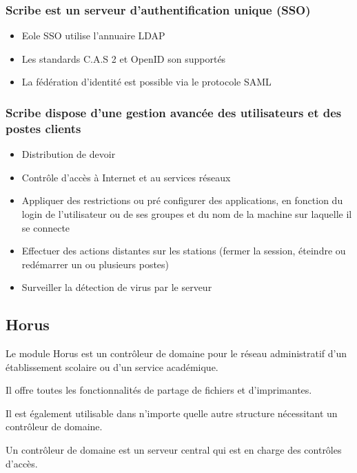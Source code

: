 \subsubsection{Scribe est un serveur d'authentification unique (SSO)}

\begin{itemize}
  \item Eole SSO utilise l'annuaire LDAP
  \item Les standards C.A.S 2 et OpenID son supportés
  \item La fédération d'identité est possible via le protocole SAML
\end{itemize}

\subsubsection{Scribe dispose d'une gestion avancée des utilisateurs et 
               des postes clients}

\begin{itemize}
  \item Distribution de devoir
  \item Contrôle d'accès à Internet et au services réseaux
  \item Appliquer des restrictions ou pré configurer des applications, en
        fonction du login de l'utilisateur ou de ses groupes et du nom de 
        la machine sur laquelle il se connecte
  \item Effectuer des actions distantes sur les stations (fermer la 
        session, éteindre ou redémarrer un ou plusieurs postes)
  \item Surveiller la détection de virus par le serveur
\end{itemize}


\subsection{Horus}

Le module Horus est un contrôleur de domaine pour le réseau administratif 
d'un établissement scolaire ou d'un service académique.

Il offre toutes les fonctionnalités de partage de fichiers et d'imprimantes.

Il est également utilisable dans n'importe quelle autre structure 
nécessitant un contrôleur de domaine.

Un contrôleur de domaine est un serveur central qui est en charge des 
contrôles d'accès.

